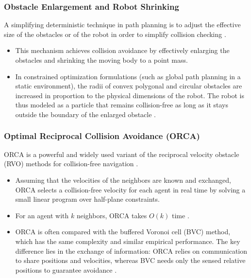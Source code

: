 \subsubsection{Obstacle Enlargement and Robot Shrinking}

A simplifying deterministic technique in path planning is to adjust the effective
size of the obstacles or of the robot in order to simplify collision checking
\cite{lin2022review}.
\begin{itemize}
  \item {} This mechanism achieves collision avoidance by
        effectively enlarging the obstacles and shrinking the moving body to a
        point mass.
  \item {} In constrained optimization formulations (such as
        global path planning in a static environment), the radii of convex
        polygonal and circular obstacles are increased in proportion to the
        physical dimensions of the robot. The robot is thus modeled as a
        particle that remains collision-free as long as it stays outside the
        boundary of the enlarged obstacle \cite{tan2016handbook}.
\end{itemize}

\subsubsection{Optimal Reciprocal Collision Avoidance (ORCA)}

ORCA is a powerful and widely used variant of the reciprocal velocity obstacle
(RVO) methods for collision-free navigation \cite{vandenberg2011reciprocal}.
\begin{itemize}
  \item {} Assuming that the velocities of the neighbors are known
        and exchanged, ORCA selects a collision-free velocity for each agent in
        real time by solving a small linear program over half-plane constraints.
  \item {} For an agent with $k$ neighbors, ORCA takes $O(k)$ time
        \cite{zhou2017fast}.
  \item {} ORCA is often compared with
        the buffered Voronoi cell (BVC) method, which has the same complexity and
        similar empirical performance. The key difference lies in the exchange of
        information: ORCA relies on communication to share positions and
        velocities, whereas BVC needs only the sensed relative positions to
        guarantee avoidance \cite{zhou2017fast}.
\end{itemize}

